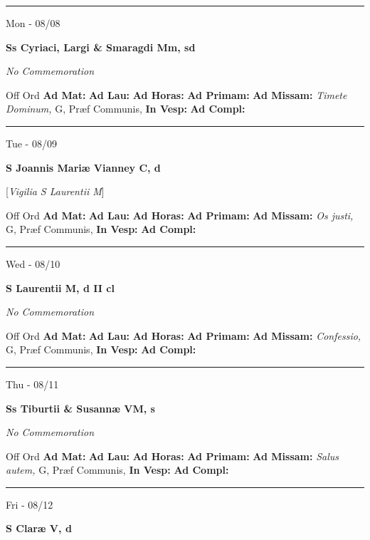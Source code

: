 \documentclass[letterpaper, 10pt]{article}
\begin{document}
\hrule
\begin{center}
Mon - 08/08
\end{center}\textbf{ \large Ss Cyriaci, Largi \& Smaragdi Mm, \textnormal{\normalsize sd}}

\textit{No Commemoration}\begin{justify}
Off Ord
\textbf{Ad Mat: }
\textbf{Ad Lau: }
\textbf{Ad Horas: }
\textbf{Ad Primam: }
\textbf{Ad Missam:} \textit{Timete Dominum, } G, Præf Communis, 
\textbf{In Vesp: }
\textbf{Ad Compl: }\end{justify}



\hrule
\begin{center}
Tue - 08/09
\end{center}\textbf{ \large S Joannis Mariæ Vianney C, \textnormal{\normalsize d}}

[\textit{Vigilia S Laurentii M}]
\begin{justify}
Off Ord
\textbf{Ad Mat: }
\textbf{Ad Lau: }
\textbf{Ad Horas: }
\textbf{Ad Primam: }
\textbf{Ad Missam:} \textit{Os justi, } G, Præf Communis, 
\textbf{In Vesp: }
\textbf{Ad Compl: }\end{justify}



\hrule
\begin{center}
Wed - 08/10
\end{center}\textbf{ \large S Laurentii M, \textnormal{\normalsize d II cl}}

\textit{No Commemoration}\begin{justify}
Off Ord
\textbf{Ad Mat: }
\textbf{Ad Lau: }
\textbf{Ad Horas: }
\textbf{Ad Primam: }
\textbf{Ad Missam:} \textit{Confessio, } G, Præf Communis, 
\textbf{In Vesp: }
\textbf{Ad Compl: }\end{justify}



\hrule
\begin{center}
Thu - 08/11
\end{center}\textbf{ \large Ss Tiburtii \& Susannæ VM, \textnormal{\normalsize s}}

\textit{No Commemoration}\begin{justify}
Off Ord
\textbf{Ad Mat: }
\textbf{Ad Lau: }
\textbf{Ad Horas: }
\textbf{Ad Primam: }
\textbf{Ad Missam:} \textit{Salus autem, } G, Præf Communis, 
\textbf{In Vesp: }
\textbf{Ad Compl: }\end{justify}



\hrule
\begin{center}
Fri - 08/12
\end{center}\textbf{ \large S Claræ V, \textnormal{\normalsize d}}
\end{document}
